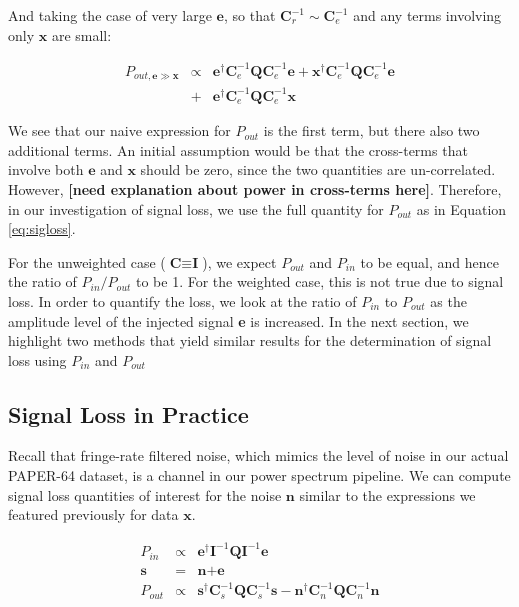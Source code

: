 \documentclass[preprint2,numberedappendix,tighten,twocolappendix]{aastex6}  %
\newcommand{\cc}[1]{{\color{purple} \textbf{[#1]}}}
\begin{document}
And taking the case of very large $\textbf{e}$, so that $\textbf{C}_{r}^{-1} \sim \textbf{C}_{e}^{-1}$ and any terms involving only $\textbf{x}$ are small:

\begin{eqnarray}
P_{out, \textbf{e} \gg \textbf{x}} &\propto& \textbf{e}^{\dagger}\textbf{C}_{e}^{-1}\textbf{Q}\textbf{C}_{e}^{-1}\textbf{e} + \textbf{x}^{\dagger}\textbf{C}_{e}^{-1}\textbf{Q}\textbf{C}_{e}^{-1}\textbf{e} \nonumber \\
&+& \textbf{e}^{\dagger}\textbf{C}_{e}^{-1}\textbf{Q}\textbf{C}_{e}^{-1}\textbf{x}
\end{eqnarray}

We see that our naive expression for $P_{out}$ is the first term, but there also two additional terms. An initial assumption would be that the cross-terms that involve both $\textbf{e}$ and $\textbf{x}$ should be zero, since the two quantities are un-correlated. However, \cc{need explanation about power in cross-terms here}. Therefore, in our investigation of signal loss, we use the full quantity for $P_{out}$ as in Equation \ref{eq:sigloss}.

For the unweighted case ($\textbf{C} \equiv \textbf{I}$), we expect $P_{out}$ and $P_{in}$ to be equal, and hence the ratio of $P_{in} / P_{out}$ to be 1. For the weighted case, this is not true due to signal loss. In order to quantify the loss, we look at the ratio of $P_{in}$ to $P_{out}$ as the amplitude level of the injected signal \textbf{e} is increased. In the next section, we highlight two methods that yield similar results for the determination of signal loss using $P_{in}$ and $P_{out}$

\subsection{Signal Loss in Practice}

Recall that fringe-rate filtered noise, which mimics the level of noise in our actual PAPER-64 dataset, is a channel in our power spectrum pipeline. We can compute signal loss quantities of interest for the noise $\textbf{n}$ similar to the expressions we featured previously for data $\textbf{x}$. 

\begin{eqnarray}
P_{in} &\propto& \textbf{e}^{\dagger}\textbf{I}^{-1}\textbf{Q}\textbf{I}^{-1}\textbf{e} \\
\textbf{s} &=& \textbf{n} + \textbf{e} \\
P_{out} &\propto& \textbf{s}^{\dagger}\textbf{C}_{s}^{-1}\textbf{Q}\textbf{C}_{s}^{-1}\textbf{s} - \textbf{n}^{\dagger}\textbf{C}_{n}^{-1}\textbf{Q}\textbf{C}_{n}^{-1}\textbf{n} 
\end{eqnarray}
\end{document}
